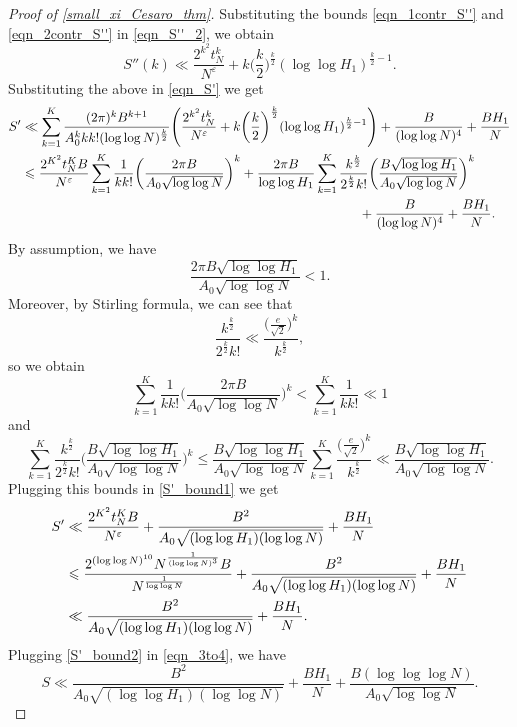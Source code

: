 \documentclass[letter,11pt]{article}
\theoremstyle{plain} %
\theoremstyle{definition} %
\theoremstyle{plain}
\theoremstyle{plain}
\theoremstyle{plain}
\numberwithin{equation}{section}
\renewcommand{\epsilon}{\varepsilon}
\renewcommand{\leq}{\leqslant}
\newcommand{\1}{\mathbbm{1}}
\begin{document}
\begin{proof}[Proof of \cref{small_xi_Cesaro_thm}]
Substituting the bounds \eqref{eqn_1contr_S''} and \eqref{eqn_2contr_S''} in \eqref{eqn_S''_2}, we obtain
$$S''(k) \ll \frac{2^{k^2}t_N^k}{N^\epsilon} + k \bigg(\frac{k}{2}\bigg)^{\frac{k}{2}}(\log\log{H_1})^{\frac{k}{2}-1}.$$
Substituting the above in \eqref{eqn_S'} we get
\begin{align}\label{S'_bound1}
    S' & \ll \sum_{k=1}^K \frac{(2\pi)^k B^{k+1}}{A_0^k k k! (\log\log{N})^\frac{k}{2}}\Bigg(\frac{2^{k^2}t_N^k}{N^\epsilon} + k \bigg(\frac{k}{2}\bigg)^{\frac{k}{2}} (\log\log{H_1})^{\frac{k}{2}-1}\Bigg) + \frac{B}{(\log\log{N})^4} + \frac{BH_1}{N} \notag \\
    & \leq \frac{2^{K^2} t_N^K B}{N^\epsilon} \sum_{k=1}^K \frac{1}{k k!}\bigg(\frac{2\pi B}{A_0\sqrt{\log\log{N}}}\bigg)^k
    + \frac{2\pi B}{\log\log{H_1}} \sum_{k=1}^K \frac{k^\frac{k}{2}}{2^\frac{k}{2}k!}\bigg(\frac{B\sqrt{\log\log{H_1}}}{A_0\sqrt{\log\log{N}}}\bigg)^k \notag \\
    & \hspace*{9cm} + \frac{B}{(\log\log{N})^4} + \frac{BH_1}{N}.
\end{align}
By assumption, we have
$$\frac{2\pi B\sqrt{\log\log{H_1}}}{A_0\sqrt{\log\log{N}}}<1.$$
Moreover, by Stirling formula, we can see that 
$$\frac{k^\frac{k}{2}}{2^\frac{k}{2}k!}\ll \frac{\Big(\frac{e}{\sqrt{2}}\Big)^k}{k^\frac{k}{2}},$$ 
so we obtain
$$\sum_{k=1}^K \frac{1}{k k!}\bigg(\frac{2\pi B}{A_0\sqrt{\log\log{N}}}\bigg)^k
< \sum_{k=1}^K \frac{1}{k k!} \ll 1$$
and
$$
\sum_{k=1}^K \frac{k^\frac{k}{2}}{2^\frac{k}{2}k!}\bigg(\frac{B\sqrt{\log\log{H_1}}}{A_0\sqrt{\log\log{N}}}\bigg)^k
\leq \frac{B\sqrt{\log\log{H_1}}}{A_0\sqrt{\log\log{N}}} \sum_{k=1}^K \frac{\Big(\frac{e}{\sqrt{2}}\Big)^k}{k^\frac{k}{2}}
\ll \frac{B\sqrt{\log\log{H_1}}}{A_0\sqrt{\log\log{N}}}.$$
Plugging this bounds in \eqref{S'_bound1} we get
\begin{align}\label{S'_bound2}
    S' & \ll \frac{2^{K^2} t_N^K B}{N^\epsilon} + \frac{B^2}{A_0\sqrt{(\log\log{H_1})(\log\log{N})}} + \frac{BH_1}{N} \notag \\
    & \leq \frac{2^{(\log\log{N})^{10}}N^\frac{1}{(\log\log{N})^3}B}{N^\frac{1}{\log\log{N}}} + \frac{B^2}{A_0\sqrt{(\log\log{H_1})(\log\log{N})}} + \frac{BH_1}{N} \notag \\
    & \ll \frac{B^2}{A_0\sqrt{(\log\log{H_1})(\log\log{N})}} + \frac{BH_1}{N}.
\end{align}
Plugging \eqref{S'_bound2} in \eqref{eqn_3to4}, we have
$$S \ll \frac{B^2}{A_0\sqrt{(\log\log{H_1})(\log\log{N})}} + \frac{BH_1}{N} + \frac{B(\log\log\log N)}{A_0\sqrt{\log\log{N}}}.$$
\end{proof}
\end{document}
